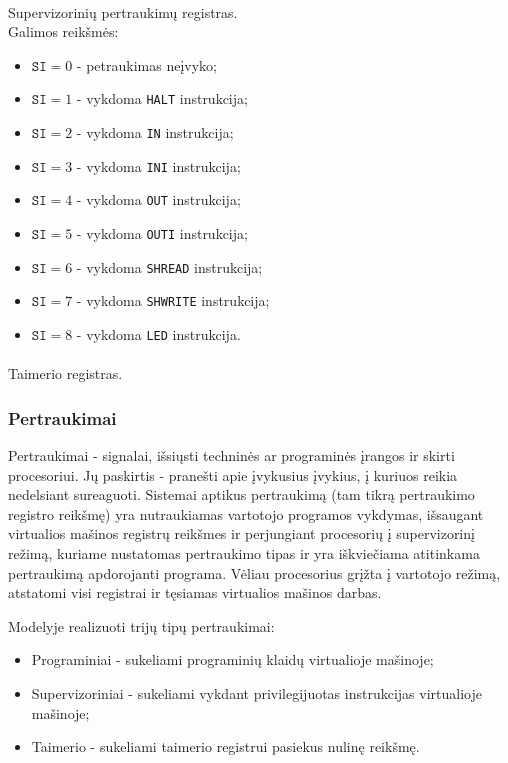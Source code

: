 \documentclass{scrartcl}
\begin{document}
                \paragraph{} Supervizorinių pertraukimų registras. \mbox{} \\
                    Galimos reikšmės:
                    \begin{itemize}
                        \item $\texttt{SI} = 0$ - petraukimas neįvyko;
                        \item $\texttt{SI} = 1$ - vykdoma \texttt{HALT} instrukcija;
                        \item $\texttt{SI} = 2$ - vykdoma \texttt{IN} instrukcija;
                        \item $\texttt{SI} = 3$ - vykdoma \texttt{INI} instrukcija;
                        \item $\texttt{SI} = 4$ - vykdoma \texttt{OUT} instrukcija;
                        \item $\texttt{SI} = 5$ - vykdoma \texttt{OUTI} instrukcija;
                        \item $\texttt{SI} = 6$ - vykdoma \texttt{SHREAD} instrukcija;
                        \item $\texttt{SI} = 7$ - vykdoma \texttt{SHWRITE} instrukcija;
                        \item $\texttt{SI} = 8$ - vykdoma \texttt{LED} instrukcija.
                    \end{itemize}
                \paragraph{} Taimerio registras.
            \subsubsection{Pertraukimai}
                Pertraukimai - signalai, išsiųsti techninės ar programinės įrangos ir skirti procesoriui. Jų paskirtis - pranešti apie įvykusius įvykius, į kuriuos reikia nedelsiant sureaguoti. Sistemai aptikus pertraukimą (tam tikrą pertraukimo registro reikšmę) yra nutraukiamas vartotojo programos vykdymas, išsaugant virtualios mašinos registrų reikšmes ir perjungiant procesorių į supervizorinį režimą, kuriame nustatomas pertraukimo tipas ir yra iškviečiama atitinkama pertraukimą apdorojanti programa. Vėliau procesorius grįžta į vartotojo režimą, atstatomi visi registrai ir tęsiamas virtualios mašinos darbas.
                \par
                Modelyje realizuoti trijų tipų pertraukimai:
                    \begin{itemize}
                        \item Programiniai - sukeliami programinių klaidų virtualioje mašinoje;
                        \item Supervizoriniai - sukeliami vykdant privilegijuotas instrukcijas virtualioje mašinoje;
                        \item Taimerio - sukeliami taimerio registrui pasiekus nulinę reikšmę.
                    \end{itemize}
\end{document}

